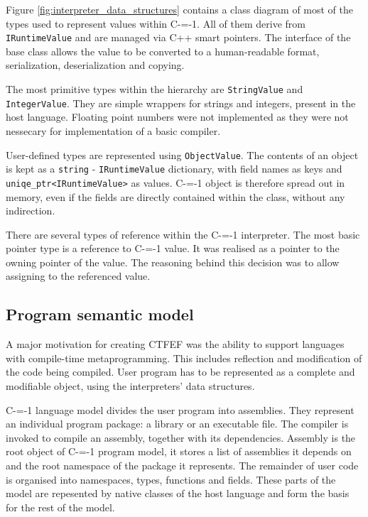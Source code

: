 Figure \ref{fig:interpreter_data_structures} contains a class diagram of most of the types used to represent values within C-=-1.
All of them derive from \lstinline{IRuntimeValue} and are managed via C++ smart pointers.
The interface of the base class allows the value to be converted to a human-readable format, serialization, deserialization and copying.

The most primitive types within the hierarchy are \lstinline{StringValue} and \lstinline{IntegerValue}.
They are simple wrappers for strings and integers, present in the host language.
Floating point numbers were not implemented as they were not nessecary for implementation of a basic compiler.

User-defined types are represented using \lstinline{ObjectValue}.
The contents of an object is kept as a \lstinline{string} - \lstinline{IRuntimeValue} dictionary, with field names as keys and \lstinline{uniqe_ptr<IRuntimeValue>} as values.
C-=-1 object is therefore spread out in memory, even if the fields are directly contained within the class, without any indirection.


There are several types of reference within the C-=-1 interpreter.
The most basic pointer type is a reference to C-=-1 value.
It was realised as a pointer to the owning pointer of the value.
The reasoning behind this decision was to allow assigning to the referenced value.

\subsection{Program semantic model}
\label{semantic_model}

A major motivation for creating CTFEF was the ability to support languages with compile-time metaprogramming.
This includes reflection and modification of the code being compiled.
User program has to be represented as a complete and modifiable object, using the interpreters' data structures.

C-=-1 language model divides the user program into assemblies.
They represent an individual program package: a library or an executable file.
The compiler is invoked to compile an assembly, together with its dependencies.
Assembly is the root object of C-=-1 program model, it stores a list of assemblies it depends on and the root namespace of the package it represents.
The remainder of user code is organised into namespaces, types, functions and fields.
These parts of the model are repesented by native classes of the host language and form the basis for the rest of the model.

